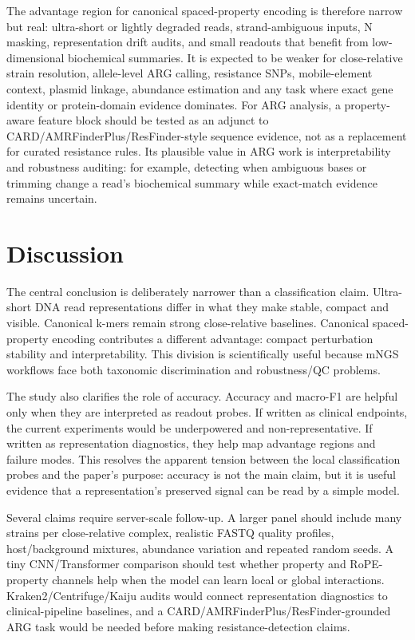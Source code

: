 \documentclass[11pt]{article}
\begin{document}
The advantage region for canonical spaced-property encoding is therefore narrow but real: ultra-short or lightly degraded reads, strand-ambiguous inputs, N masking, representation drift audits, and small readouts that benefit from low-dimensional biochemical summaries. It is expected to be weaker for close-relative strain resolution, allele-level ARG calling, resistance SNPs, mobile-element context, plasmid linkage, abundance estimation and any task where exact gene identity or protein-domain evidence dominates. For ARG analysis, a property-aware feature block should be tested as an adjunct to CARD/AMRFinderPlus/ResFinder-style sequence evidence, not as a replacement for curated resistance rules. Its plausible value in ARG work is interpretability and robustness auditing: for example, detecting when ambiguous bases or trimming change a read's biochemical summary while exact-match evidence remains uncertain.


\section*{Discussion}

The central conclusion is deliberately narrower than a classification claim. Ultra-short DNA read representations differ in what they make stable, compact and visible. Canonical k-mers remain strong close-relative baselines. Canonical spaced-property encoding contributes a different advantage: compact perturbation stability and interpretability. This division is scientifically useful because mNGS workflows face both taxonomic discrimination and robustness/QC problems.


The study also clarifies the role of accuracy. Accuracy and macro-F1 are helpful only when they are interpreted as readout probes. If written as clinical endpoints, the current experiments would be underpowered and non-representative. If written as representation diagnostics, they help map advantage regions and failure modes. This resolves the apparent tension between the local classification probes and the paper's purpose: accuracy is not the main claim, but it is useful evidence that a representation's preserved signal can be read by a simple model.


Several claims require server-scale follow-up. A larger panel should include many strains per close-relative complex, realistic FASTQ quality profiles, host/background mixtures, abundance variation and repeated random seeds. A tiny CNN/Transformer comparison should test whether property and RoPE-property channels help when the model can learn local or global interactions. Kraken2/Centrifuge/Kaiju audits would connect representation diagnostics to clinical-pipeline baselines, and a CARD/AMRFinderPlus/ResFinder-grounded ARG task would be needed before making resistance-detection claims.
\end{document}
